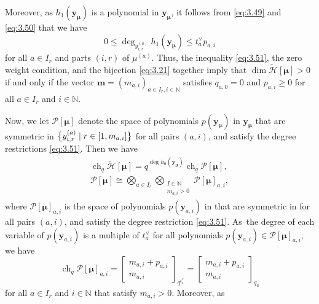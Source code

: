 \documentclass[10pt,a4paper]{amsart}
\numberwithin{equation}{section}
\DeclareMathOperator{\ch}{ch}
\begin{document}
Moreover, as $h_1(\mathbf{y}_{\bm{\mu}})$ is a polynomial in $\mathbf{y}_{ \bm{\mu}}$, it follows from \eqref{eq:3.49} and \eqref{eq:3.50} that we have
\begin{equation}\label{eq:3.51}
0\leq \deg_{y_{i,r}^{(a)}}h_1(\mathbf{y}_{\bm{\mu}})
\leq t_a^{\vee}p_{a,i}
\end{equation}
for all $a\in I_r$ and parts $(i,r)$ of $\mu^{(a)}$. Thus, the inequality \eqref{eq:3.51}, the zero weight condition, and the bijection \eqref{eq:3.21} together imply that $\dim\tilde{\mathcal{H}}[\bm{\mu}]>0$ if and only if the vector $\mathbf{m}=(m_{a,i})_{a\in I_r,i\in \mathbb{N}}$ satisfies $q_{a,0}=0$ and
$p_{a,i}\geq0$ for all $a\in I_r$ and $i\in\mathbb{N}$.

Now, we let $\mathcal{P}[\bm{\mu}]$ denote the space of polynomials $p(\mathbf{y}_{\bm{\mu}})$ in $\mathbf{y}_{\bm{\mu}}$ that are symmetric in $\bigl\{\smash{y_{i,r}^{(a)}}\mid r\in[1,m_{a,i}]\bigr\}$ for all pairs $(a,i)$, and satisfy the degree restrictions \eqref{eq:3.51}. Then we have
\begin{gather}
\ch_q\tilde{\mathcal{H}}[\bm{\mu}]
=q^{\deg h_0(\mathbf{y}_{\bm{\mu}})}\ch_q\mathcal{P}[\bm{\mu}],\label{eq:3.52}\\
\mathcal{P}[\bm{\mu}]
\cong\bigotimes_{a\in I_r}\bigotimes_{\substack{I\in\mathbb{N}\\m_{a,i}>0}}\mathcal{P}[\bm{\mu}]_{a,i},\label{eq:3.53}
\end{gather}
where $\mathcal{P}[\bm{\mu}]_{a,i}$ is the space of polynomials $p(\mathbf{y}_{a,i})$ in  that are symmetric in  for all pairs $(a,i)$, and satisfy the degree restriction \eqref{eq:3.51}. As~the degree of each variable  of $p(\mathbf{y}_{a,i})$ is a multiple of $t_a^{\vee}$ for all polynomials $p(\mathbf{y}_{a,i})\in\mathcal{P}[\bm{\mu}]_{a,i}$, we have
\begin{equation*}
\ch_q\mathcal{P}[\bm{\mu}]_{a,i}=\begin{bmatrix} m_{a,i}+p_{a,i} \\m_{a,i}\end{bmatrix}_{q^{t_a^{\vee}}}=\begin{bmatrix} m_{a,i}+p_{a,i}\\m_{a,i}\end{bmatrix}_{q_a}
\end{equation*}
for all $a\in I_r$ and $i\in\mathbb{N}$ that satisfy $m_{a,i}>0$. Moreover, as
\end{document}
